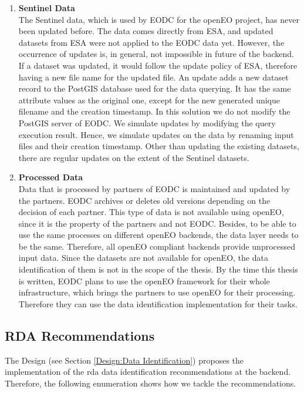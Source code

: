 \documentclass[draft,final]{vutinfth} %
\begin{document}
\begin{enumerate}
	\item \textbf{Sentinel Data} \\
	The Sentinel data, which is used by EODC for the openEO project, has never been updated before. The data comes directly from ESA, and updated datasets from ESA were not applied to the EODC data yet. However, the occurrence of updates is, in general, not impossible in future of the backend. If a dataset was updated, it would follow the update policy of ESA, therefore having a new file name for the updated file. {An update adds a new dataset record to the PostGIS database used for the data querying. It has the same attribute values as the original one, except for the new generated unique filename and the creation timestamp. In this solution we do not modify the PostGIS server of EODC. We simulate updates by modifying the query execution result.} Hence, we simulate updates on the data by renaming input files and their creation timestamp. Other than updating the existing datasets, there are regular updates on the extent of the Sentinel datasets.   
	\item \textbf{Processed Data} \\
	Data that is processed by partners of EODC is maintained and updated by the partners. EODC archives or deletes old versions depending on the decision of each partner. This type of data is not available using openEO, since it is the property of the partners and not EODC. Besides, to be able to use the same processes on different openEO backends, the data layer needs to be the same. Therefore, all openEO compliant backends provide unprocessed input data. Since the datasets are not available for openEO, the data identification of them is not in the scope of the thesis. By the time this thesis is written, EODC plans to use the openEO framework for their whole infrastructure, which brings the partners to use openEO for their processing. Therefore they can use the data identification implementation for their tasks.
\end{enumerate}

\subsection{RDA Recommendations}\label{Evaluation:dataidentification}
The Design (see Section \ref{Design:Data Identification}) proposes the implementation of the \acrshort{rda} data identification recommendations at the backend. Therefore, the following enumeration shows how we tackle the recommendations. 
\end{document}

